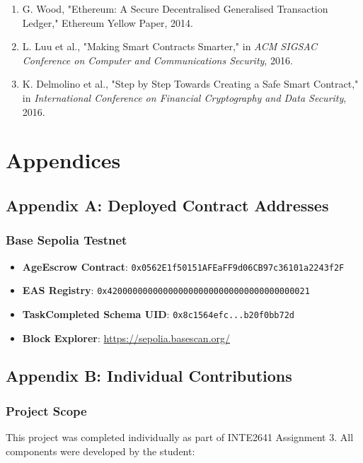 \documentclass[12pt,a4paper]{article}
\begin{document}
\begin{enumerate}
    \item G. Wood, "Ethereum: A Secure Decentralised Generalised Transaction Ledger," Ethereum Yellow Paper, 2014.

    \item L. Luu et al., "Making Smart Contracts Smarter," in \textit{ACM SIGSAC Conference on Computer and Communications Security}, 2016.
    
    \item K. Delmolino et al., "Step by Step Towards Creating a Safe Smart Contract," in \textit{International Conference on Financial Cryptography and Data Security}, 2016.
\end{enumerate}

\section{Appendices}

\subsection{Appendix A: Deployed Contract Addresses}

\subsubsection{Base Sepolia Testnet}
\begin{itemize}
    \item \textbf{AgeEscrow Contract}: \texttt{0x0562E1f50151AFEaFF9d06CB97c36101a2243f2F}
    \item \textbf{EAS Registry}: \texttt{0x4200000000000000000000000000000000000021}
    \item \textbf{TaskCompleted Schema UID}: \texttt{0x8c1564efc...b20f0bb72d}
    \item \textbf{Block Explorer}: \url{https://sepolia.basescan.org/}
\end{itemize}

\subsection{Appendix B: Individual Contributions}

\subsubsection{Project Scope}
This project was completed individually as part of INTE2641 Assignment 3. All components were developed by the student:
\end{document}

